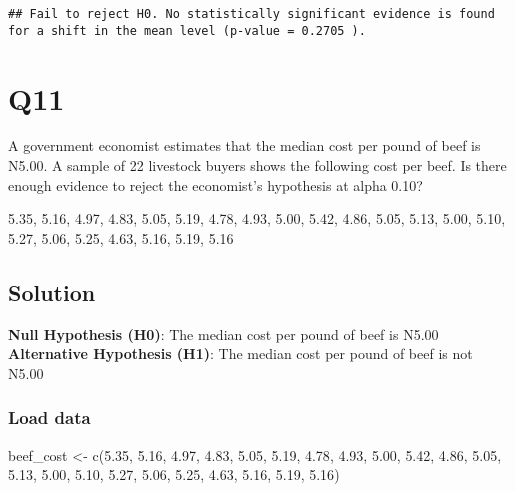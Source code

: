 \documentclass[
]{article}
\newenvironment{Shaded}{\begin{snugshade}}{\end{snugshade}}
\newcommand{\FloatTok}[1]{\textcolor[rgb]{0.00,0.00,0.81}{#1}}
\newcommand{\FunctionTok}[1]{\textcolor[rgb]{0.00,0.00,0.00}{#1}}
\newcommand{\NormalTok}[1]{#1}
\newcommand{\OtherTok}[1]{\textcolor[rgb]{0.56,0.35,0.01}{#1}}
\begin{document}
\begin{verbatim}
## Fail to reject H0. No statistically significant evidence is found for a shift in the mean level (p-value = 0.2705 ).
\end{verbatim}

\hypertarget{q11}{%
\section{Q11}\label{q11}}

A government economist estimates that the median cost per pound of beef
is N5.00. A sample of 22 livestock buyers shows the following cost per
beef. Is there enough evidence to reject the economist's hypothesis at
alpha 0.10?

5.35, 5.16, 4.97, 4.83, 5.05, 5.19, 4.78, 4.93, 5.00, 5.42, 4.86, 5.05,
5.13, 5.00, 5.10, 5.27, 5.06, 5.25, 4.63, 5.16, 5.19, 5.16

\hypertarget{solution-11}{%
\subsection{Solution}\label{solution-11}}

\textbf{Null Hypothesis (H0)}: The median cost per pound of beef is
N5.00 \textbf{Alternative Hypothesis (H1)}: The median cost per pound of
beef is not N5.00

\hypertarget{load-data-12}{%
\subsubsection{Load data}\label{load-data-12}}

\begin{Shaded}
\begin{Highlighting}[]
\NormalTok{beef\_cost }\OtherTok{\textless{}{-}} \FunctionTok{c}\NormalTok{(}\FloatTok{5.35}\NormalTok{, }\FloatTok{5.16}\NormalTok{, }\FloatTok{4.97}\NormalTok{, }\FloatTok{4.83}\NormalTok{, }\FloatTok{5.05}\NormalTok{, }\FloatTok{5.19}\NormalTok{, }\FloatTok{4.78}\NormalTok{, }\FloatTok{4.93}\NormalTok{, }\FloatTok{5.00}\NormalTok{, }\FloatTok{5.42}\NormalTok{, }
               \FloatTok{4.86}\NormalTok{, }\FloatTok{5.05}\NormalTok{, }\FloatTok{5.13}\NormalTok{, }\FloatTok{5.00}\NormalTok{, }\FloatTok{5.10}\NormalTok{, }\FloatTok{5.27}\NormalTok{, }\FloatTok{5.06}\NormalTok{, }\FloatTok{5.25}\NormalTok{, }\FloatTok{4.63}\NormalTok{, }\FloatTok{5.16}\NormalTok{, }
               \FloatTok{5.19}\NormalTok{, }\FloatTok{5.16}\NormalTok{)}
\end{Highlighting}
\end{Shaded}
\end{document}
